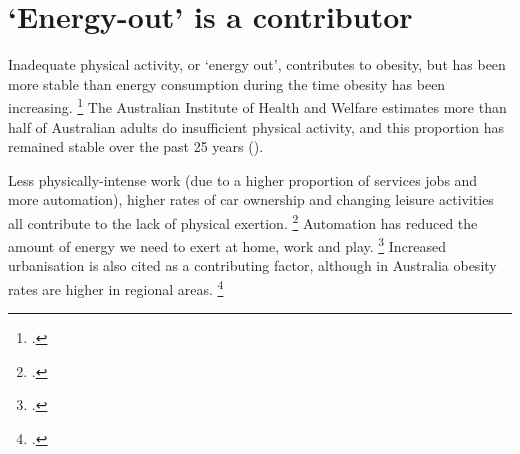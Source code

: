 \documentclass[embargoed]{grattan}
\begin{document}
\section{`Energy-out' is a contributor }\label{energy-out-is-a-contributor}

Inadequate physical activity, or `energy out', contributes to obesity, but has been more stable than energy consumption during the time obesity has been increasing.%
\footcites{Keith2006Putativecontributorssecular}{Popkin2004nutritiontransitionworldwide}{Wikland2016}{Stubbs2004obesityepidemicboth} The Australian Institute of Health and Welfare estimates more than half of Australian adults do insufficient physical activity, and this proportion has remained stable over the past 25 years ().

Less physically-intense work (due to a higher proportion of services jobs and more automation), higher rates of car ownership and changing leisure activities all contribute to the lack of physical exertion. \footcites{Popkin2004nutritiontransitionworldwide}{Finkelstein2010EconomicsObesity}{Popkin1998obesityepidemicis}{Drewnowski1997nutritiontransitionnew} Automation has reduced the amount of energy we need to exert at home, work and play.%
\footcites{Caballero2007globalepidemicobesity}{Popkin2004nutritiontransitionworldwide} Increased urbanisation is also cited as a contributing factor, although in Australia obesity rates are higher in regional areas.%
\footcites{ABS2013436405503AustralianHealth}{Popkin1998obesityepidemicis}{Drewnowski1997nutritiontransitionnew}
\end{document}
